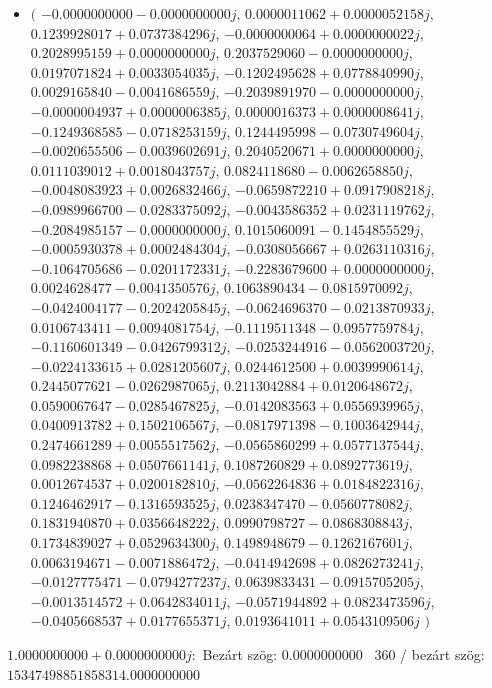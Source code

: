 \documentclass[14pt,a4paper]{article}
\begin{document}
\begin{itemize}
\item
$\big($
$-0.0000000000-0.0000000000j$, $0.0000011062+0.0000052158j$, $0.1239928017+0.0737384296j$, $-0.0000000064+0.0000000022j$, $0.2028995159+0.0000000000j$, $0.2037529060-0.0000000000j$, $0.0197071824+0.0033054035j$, $-0.1202495628+0.0778840990j$, $0.0029165840-0.0041686559j$, $-0.2039891970-0.0000000000j$, $-0.0000004937+0.0000006385j$, $0.0000016373+0.0000008641j$, $-0.1249368585-0.0718253159j$, $0.1244495998-0.0730749604j$, $-0.0020655506-0.0039602691j$, $0.2040520671+0.0000000000j$, $0.0111039012+0.0018043757j$, $0.0824118680-0.0062658850j$, $-0.0048083923+0.0026832466j$, $-0.0659872210+0.0917908218j$, $-0.0989966700-0.0283375092j$, $-0.0043586352+0.0231119762j$, $-0.2084985157-0.0000000000j$, $0.1015060091-0.1454855529j$, $-0.0005930378+0.0002484304j$, $-0.0308056667+0.0263110316j$, $-0.1064705686-0.0201172331j$, $-0.2283679600+0.0000000000j$, $0.0024628477-0.0041350576j$, $0.1063890434-0.0815970092j$, $-0.0424004177-0.2024205845j$, $-0.0624696370-0.0213870933j$, $0.0106743411-0.0094081754j$, $-0.1119511348-0.0957759784j$, $-0.1160601349-0.0426799312j$, $-0.0253244916-0.0562003720j$, $-0.0224133615+0.0281205607j$, $0.0244612500+0.0039990614j$, $0.2445077621-0.0262987065j$, $0.2113042884+0.0120648672j$, $0.0590067647-0.0285467825j$, $-0.0142083563+0.0556939965j$, $0.0400913782+0.1502106567j$, $-0.0817971398-0.1003642944j$, $0.2474661289+0.0055517562j$, $-0.0565860299+0.0577137544j$, $0.0982238868+0.0507661141j$, $0.1087260829+0.0892773619j$, $0.0012674537+0.0200182810j$, $-0.0562264836+0.0184822316j$, $0.1246462917-0.1316593525j$, $0.0238347470-0.0560778082j$, $0.1831940870+0.0356648222j$, $0.0990798727-0.0868308843j$, $0.1734839027+0.0529634300j$, $0.1498948679-0.1262167601j$, $0.0063194671-0.0071886472j$, $-0.0414942698+0.0826273241j$, $-0.0127775471-0.0794277237j$, $0.0639833431-0.0915705205j$, $-0.0013514572+0.0642834011j$, $-0.0571944892+0.0823473596j$, $-0.0405668537+0.0177655371j$, $0.0193641011+0.0543109506j$
$\big)$
\end{itemize}
$1.0000000000+0.0000000000j$:\
Bezárt szög: $0.0000000000$ \
360 / bezárt szög: $15347498851858314.0000000000$\
\end{document}
